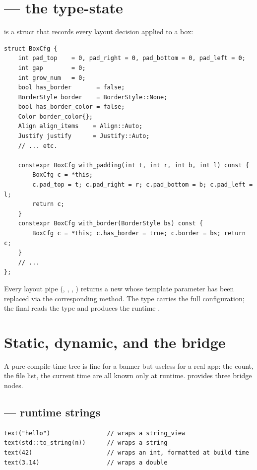 \section{ --- the type-state}

 is a  struct that records every layout
decision applied to a box:

\begin{lstlisting}
struct BoxCfg {
    int pad_top    = 0, pad_right = 0, pad_bottom = 0, pad_left = 0;
    int gap        = 0;
    int grow_num   = 0;
    bool has_border       = false;
    BorderStyle border    = BorderStyle::None;
    bool has_border_color = false;
    Color border_color{};
    Align align_items    = Align::Auto;
    Justify justify      = Justify::Auto;
    // ... etc.

    constexpr BoxCfg with_padding(int t, int r, int b, int l) const {
        BoxCfg c = *this;
        c.pad_top = t; c.pad_right = r; c.pad_bottom = b; c.pad_left = l;
        return c;
    }
    constexpr BoxCfg with_border(BorderStyle bs) const {
        BoxCfg c = *this; c.has_border = true; c.border = bs; return c;
    }
    // ...
};
\end{lstlisting}

Every layout pipe (, , ,
) returns a new  whose 
template parameter has been replaced via the corresponding
 method. The type carries the full configuration; the
final  reads the type and produces the runtime
.

\section{Static, dynamic, and the bridge}

A pure-compile-time tree is fine for a banner but useless for a real
app: the count, the file list, the current time are all known only at
runtime. \maya{} provides three bridge nodes.

\subsection{ --- runtime strings}

\begin{lstlisting}
text("hello")                // wraps a string_view
text(std::to_string(n))      // wraps a string
text(42)                     // wraps an int, formatted at build time
text(3.14)                   // wraps a double
\end{lstlisting}

